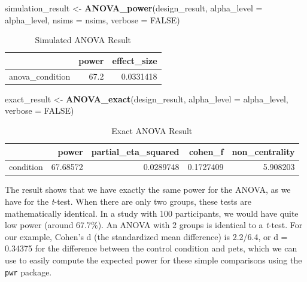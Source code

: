 \documentclass[]{book}
\newenvironment{Shaded}{\begin{snugshade}}{\end{snugshade}}
\newcommand{\DataTypeTok}[1]{\textcolor[rgb]{0.13,0.29,0.53}{#1}}
\newcommand{\KeywordTok}[1]{\textcolor[rgb]{0.13,0.29,0.53}{\textbf{#1}}}
\newcommand{\NormalTok}[1]{#1}
\newcommand{\OtherTok}[1]{\textcolor[rgb]{0.56,0.35,0.01}{#1}}
\newcommand{\StringTok}[1]{\textcolor[rgb]{0.31,0.60,0.02}{#1}}
\begin{document}
\begin{Shaded}
\begin{Highlighting}[]
\NormalTok{simulation_result <-}\StringTok{ }\KeywordTok{ANOVA_power}\NormalTok{(design_result, }
                                 \DataTypeTok{alpha_level =}\NormalTok{ alpha_level, }
                                 \DataTypeTok{nsims =}\NormalTok{ nsims,}
                                 \DataTypeTok{verbose =} \OtherTok{FALSE}\NormalTok{)}
\end{Highlighting}
\end{Shaded}

\begin{table}[!h]

\caption{\label{tab:unnamed-chunk-9}Simulated ANOVA Result}
\centering
\begin{tabular}{l|r|r}
\hline
  & power & effect\_size\\
\hline
anova\_condition & 67.2 & 0.0331418\\
\hline
\end{tabular}
\end{table}

\begin{Shaded}
\begin{Highlighting}[]
\NormalTok{exact_result <-}\StringTok{ }\KeywordTok{ANOVA_exact}\NormalTok{(design_result,}
                            \DataTypeTok{alpha_level =}\NormalTok{ alpha_level,}
                            \DataTypeTok{verbose =} \OtherTok{FALSE}\NormalTok{)}
\end{Highlighting}
\end{Shaded}

\begin{table}[!h]

\caption{\label{tab:unnamed-chunk-11}Exact ANOVA Result}
\centering
\begin{tabular}{l|r|r|r|r}
\hline
  & power & partial\_eta\_squared & cohen\_f & non\_centrality\\
\hline
condition & 67.68572 & 0.0289748 & 0.1727409 & 5.908203\\
\hline
\end{tabular}
\end{table}

The result shows that we have exactly the same power for the ANOVA, as we have for the \emph{t}-test. When there are only two groups, these tests are mathematically identical. In a study with 100 participants, we would have quite low power (around 67.7\%). An ANOVA with 2 groups is identical to a \emph{t}-test. For our example, Cohen's d (the standardized mean difference) is 2.2/6.4, or d = 0.34375 for the difference between the control condition and pets, which we can use to easily compute the expected power for these simple comparisons using the \texttt{pwr} \citeyearpar{R-pwr} package.
\end{document}
